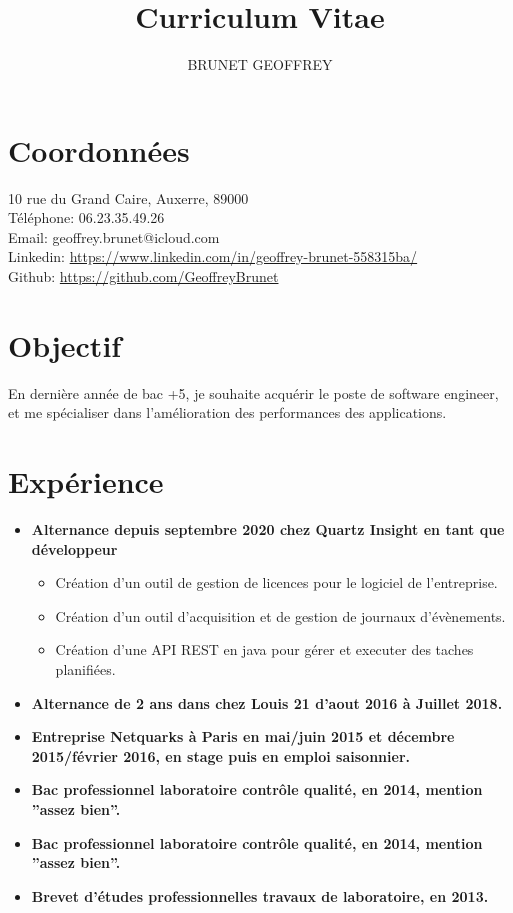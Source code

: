 \documentclass{article}
\title{Curriculum Vitae}
\author{BRUNET GEOFFREY}
\date{}
\begin{document}
\begin{multicols}{2}

\maketitle

\section*{Coordonnées}
10 rue du Grand Caire, Auxerre, 89000 \\
Téléphone: 06.23.35.49.26 \\
Email: geoffrey.brunet@icloud.com \\
Linkedin: \url{https://www.linkedin.com/in/geoffrey-brunet-558315ba/} \\
Github: \url{https://github.com/GeoffreyBrunet}

\section*{Objectif}
En dernière année de bac +5, je souhaite acquérir le poste de software engineer, et me spécialiser dans l’amélioration des performances des applications.

\section*{Expérience}
\begin{itemize}
    \item \textbf{Alternance depuis septembre 2020 chez Quartz Insight en tant que développeur}
    \begin{itemize}
        \item Création d’un outil de gestion de licences pour le logiciel de l’entreprise.
        \item Création d’un outil d’acquisition et de gestion de journaux d’évènements.
        \item Création d’une API REST en java pour gérer et executer des taches planifiées.
    \end{itemize}
    \item \textbf{Alternance de 2 ans dans chez Louis 21 d’aout 2016 à Juillet 2018.}
    \item \textbf{Entreprise Netquarks à Paris en mai/juin 2015 et décembre 2015/février 2016, en stage puis en emploi saisonnier.}
    \item \textbf{Bac professionnel laboratoire contrôle qualité, en 2014, mention ”assez bien”.}
    \item \textbf{Bac professionnel laboratoire contrôle qualité, en 2014, mention ”assez bien”.}
    \item \textbf{Brevet d’études professionnelles travaux de laboratoire, en 2013.}
\end{itemize}


\end{multicols}
\end{document}
